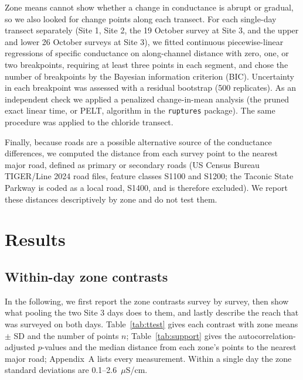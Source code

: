 \documentclass{article}
\begin{document}
Zone means cannot show whether a change in conductance is abrupt or gradual, so we also looked for change points along each transect. For each single-day transect separately (Site 1, Site 2, the 19 October survey at Site 3, and the upper and lower 26 October surveys at Site 3), we fitted continuous piecewise-linear regressions of specific conductance on along-channel distance with zero, one, or two breakpoints, requiring at least three points in each segment, and chose the number of breakpoints by the Bayesian information criterion (BIC). Uncertainty in each breakpoint was assessed with a residual bootstrap (500 replicates). As an independent check we applied a penalized change-in-mean analysis (the pruned exact linear time, or PELT, algorithm in the \texttt{ruptures} package). The same procedure was applied to the chloride transect.

Finally, because roads are a possible alternative source of the conductance differences, we computed the distance from each survey point to the nearest major road, defined as primary or secondary roads (US Census Bureau TIGER/Line 2024 road files, feature classes S1100 and S1200; the Taconic State Parkway is coded as a local road, S1400, and is therefore excluded). We report these distances descriptively by zone and do not test them.

\section{Results}

\subsection{Within-day zone contrasts}\label{sec:contrasts}

In the following, we first report the zone contrasts survey by survey, then show what pooling the two Site 3 days does to them, and lastly describe the reach that was surveyed on both days. Table~\ref{tab:ttest} gives each contrast with zone means $\pm$ SD and the number of points $n$; Table~\ref{tab:support} gives the autocorrelation-adjusted $p$-values and the median distance from each zone's points to the nearest major road; Appendix~A lists every measurement. Within a single day the zone standard deviations are 0.1--2.6~$\mu$S/cm.

\begin{table}[htbp]
	\caption{Within-day zone contrasts in specific conductance ($\mu$S/cm). $\Delta$ is downstream minus upstream, with its Welch 95\% CI; $U$ and $p_{\mathrm{MW}}$ are from the Mann--Whitney test. $^\dagger$ marks a zone with fewer than five points.}
	\centering
	\scriptsize
	\setlength{\tabcolsep}{3pt}
	\resizebox{\linewidth}{!}{}
	\label{tab:ttest}
\end{table}
\end{document}
